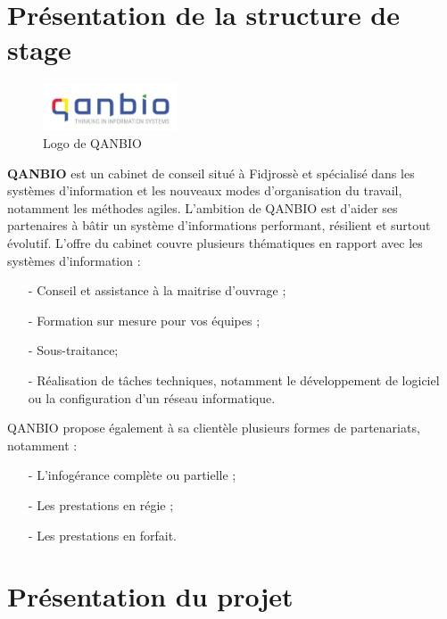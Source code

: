 \documentclass[12pt]{report}
\begin{document}
    \section{Présentation de la structure de stage}
      \begin{figure}[H]
	\begin{center}
	  \includegraphics[scale=0.6, width=4cm]{images/logoQanbio.png}
	    \caption{Logo de QANBIO}
	\end{center}
      \end{figure}
      \textbf{QANBIO} est un cabinet de conseil situé à Fidjrossè et spécialisé dans les systèmes d’information et les nouveaux modes d’organisation du travail, notamment les méthodes agiles. L’ambition de QANBIO est d’aider ses partenaires à bâtir un système d’informations performant, résilient et surtout évolutif. L’offre du cabinet couvre plusieurs thématiques en rapport avec les systèmes d’information :
      \begin{itemize}
	  \item[-] Conseil et assistance à la maitrise d’ouvrage ;
	  \item[-] Formation sur mesure pour vos équipes ;
	  \item[-] Sous-traitance;
	  \item[-] Réalisation de tâches techniques, notamment le développement de logiciel ou la configuration d’un réseau informatique.
      \end{itemize}
      QANBIO propose également à sa clientèle plusieurs formes de partenariats, notamment :
      \begin{itemize}
	  \item[-] L’infogérance complète ou partielle ;
	  \item[-] Les prestations en régie ;
	  \item[-] Les prestations en forfait.
      \end{itemize}
    
    \section{Présentation du projet}
    
\end{document}

